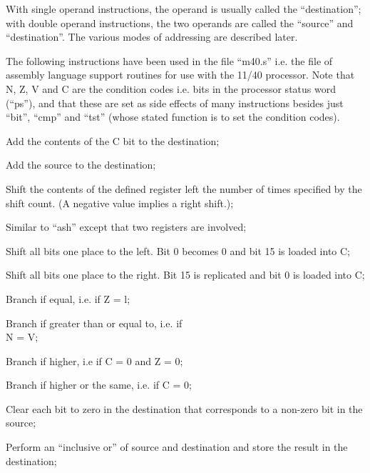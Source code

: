 With single operand instructions, the
operand is usually called the ``destination'';
with double operand instructions, the two operands are called the
``source'' and ``destination''. The various
modes of addressing are described later.

The following instructions have been
used in the file ``m40.s'' i.e. the file
of assembly language support routines
for use with the 11/40 processor. Note
that N, Z, V and C are the condition
codes i.e. bits in the processor status
word (``ps''), and that these are set as
side effects of many instructions
besides just ``bit'', ``cmp'' and ``tst''
(whose stated function is to set the
condition codes).

\bd
\item[adc] Add the contents of the C bit to
the destination;

\item[add] Add the source to the destination;

\item[ash] Shift the contents of the defined
register left the number of times
specified by the shift count. (A
negative value implies a right
shift.);

\item[ashc] Similar to ``ash'' except that two
registers are involved;


\item[asl] Shift all bits one place to the
left. Bit 0 becomes 0 and bit 15
is loaded into C;


\item[asr] Shift all bits one place to the
right. Bit 15 is replicated and
bit 0 is loaded into C;

\item[beq] Branch if equal, i.e. if Z = l;


\item[bge] Branch if greater than or equal
to, i.e. if\\
N = V;

\item[bhi] Branch if higher, i.e if C = 0 and
Z = 0;

\item[bhis] Branch if higher or the same, i.e.
if C = 0;


\item[bic] Clear each bit to zero in the
destination that corresponds to a
non-zero bit in the source;


\item[bis] Perform an ``inclusive or'' of
source and destination and store
the result in the destination;


